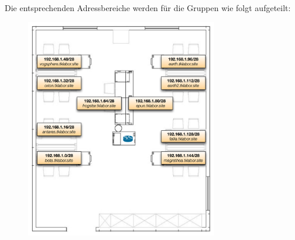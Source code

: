 \newline
\newline
Die entsprechenden Adressbereiche werden für die Gruppen wie folgt aufgeteilt:
\begin{figure}[H]
\begin{center}
\includegraphics[width=0.75\textwidth]{images/lab-aufbau.png}
\end{center}
\end{figure}